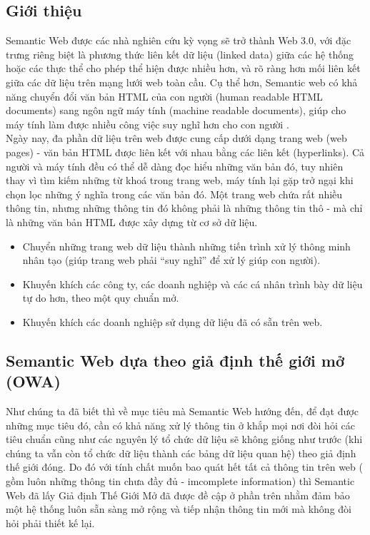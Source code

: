 \subsection{Giới thiệu}
Semantic Web được các nhà nghiên cứu kỳ vọng sẽ trở thành Web 3.0, với đặc trưng riêng biệt là phương thức liên kết dữ liệu (linked data) giữa các hệ thống hoặc các thực thể cho phép thể hiện được nhiều hơn, và rõ ràng hơn mối liên kết giữa các dữ liệu trên mạng lưới web toàn cầu. Cụ thể hơn, Semantic web có khả năng chuyển đổi văn bản HTML của con người (human readable HTML documents) sang ngôn ngữ máy tính (machine readable documents), giúp cho máy tính làm được nhiều công việc suy nghĩ hơn cho con người \cite{semantic1}.
\\
Ngày nay, đa phần dữ liệu trên web được cung cấp dưới dạng trang web (web pages) - văn bản HTML được liên kết với nhau bằng các liên kết (hyperlinks). Cả người và máy tính đều có thể dễ dàng đọc hiểu những văn bản đó, tuy nhiên thay vì tìm kiếm những từ khoá trong trang web, máy tính lại gặp trở ngại khi chọn lọc những ý nghĩa trong các văn bản đó. Một trang web chứa rất nhiều thông tin, nhưng những thông tin đó không phải là những thông tin thô - mà chỉ là những văn bản HTML được xây dựng từ cơ sở dữ liệu.
\begin{itemize}
\item Chuyển những trang web dữ liệu thành những tiến trình xử lý thông minh nhân tạo (giúp trang web phải “suy nghĩ” để xử lý giúp con người).
\item Khuyến khích các công ty, các doanh nghiệp và các cá nhân trình bày dữ liệu tự do hơn, theo một quy chuẩn mở.
\item Khuyến khích các doanh nghiệp sử dụng dữ liệu đã có sẵn trên web.
\end{itemize}

\subsection{Semantic Web dựa theo giả định thế giới mở (OWA)} 
Như chúng ta đã biết thì về mục tiêu mà Semantic Web hướng đến, để đạt được những mục tiêu đó, cần có khả năng xử lý thông tin ở khắp mọi nơi đòi hỏi các tiêu chuẩn cũng như các nguyên lý tổ chức dữ liệu sẽ không giống như trước (khi chúng ta vẫn còn tổ chức dữ liệu thành các bảng dữ liệu quan hệ) theo giả định thế giới đóng. Do đó với tính chất muốn bao quát hết tất cả thông tin trên web ( gồm luôn những thông tin chưa đầy đủ - imcomplete information) thì Semantic Web đã lấy Giả định Thế Giới Mở đã được đề cập ở phần trên nhằm đảm bảo một hệ thống luôn sẵn sàng mở rộng và tiếp nhận thông tin mới mà không đòi hỏi phải thiết kế lại.
